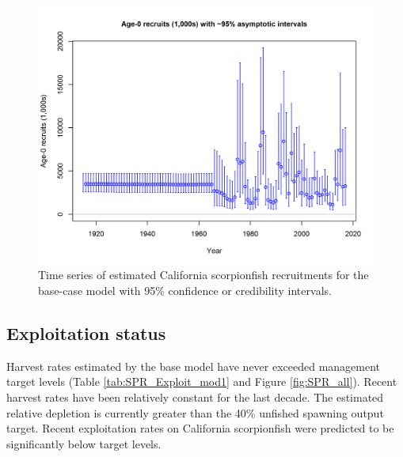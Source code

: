 \documentclass[12pt,]{article}
\begin{document}
\begin{figure}[htbp]
\centering
\includegraphics{r4ss/plots_mod1/ts11_Age-0_recruits_(1000s)_with_95_asymptotic_intervals.png}
\caption{Time series of estimated California scorpionfish recruitments
for the base-case model with 95\% confidence or credibility intervals.
\label{fig:Recruits_all}}
\end{figure}

\FloatBarrier

\subsection*{Exploitation status}\label{exploitation-status}

Harvest rates estimated by the base model have never exceeded management
target levels (Table \ref{tab:SPR_Exploit_mod1} and Figure
\ref{fig:SPR_all}). Recent harvest rates have been relatively constant
for the last decade. The estimated relative depletion is currently
greater than the 40\% unfished spawning output target. Recent
exploitation rates on California scorpionfish were predicted to be
significantly below target levels.

\FloatBarrier
\end{document}
